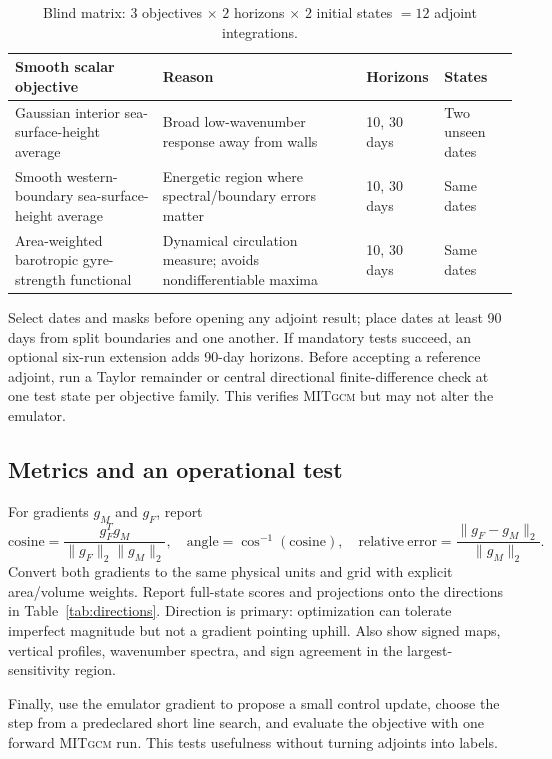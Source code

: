 \documentclass[11pt]{article}
\newcommand{\MITgcm}{\textsc{MITgcm}}
\begin{document}
\begin{table}[htbp]\centering\small
\caption{Blind matrix: \(3\) objectives \(\times\) \(2\) horizons \(\times\)
\(2\) initial states \(=12\) adjoint integrations.}
\label{tab:adjoints}
\begin{tabularx}{\textwidth}{@{}p{}Yp{0.17\textwidth}p{0.16\textwidth}@{}}
\toprule
\textbf{Smooth scalar objective} & \textbf{Reason} & \textbf{Horizons} & \textbf{States} \\
\midrule
Gaussian interior sea-surface-height average & Broad low-wavenumber response away from walls & 10, 30 days & Two unseen dates \\
Smooth western-boundary sea-surface-height average & Energetic region where spectral/boundary errors matter & 10, 30 days & Same dates \\
Area-weighted barotropic gyre-strength functional & Dynamical circulation measure; avoids nondifferentiable maxima & 10, 30 days & Same dates \\
\bottomrule
\end{tabularx}
\end{table}

Select dates and masks before opening any adjoint result; place dates at least 90 days
from split boundaries and one another. If mandatory tests succeed, an optional six-run
extension adds 90-day horizons. Before accepting a reference adjoint, run a Taylor
remainder or central directional finite-difference check at one test state per objective
family. This verifies \MITgcm{} but may not alter the emulator.

\subsection{Metrics and an operational test}
For gradients \(g_M\) and \(g_F\), report
\[
\mathrm{cosine}=\frac{g_F^Tg_M}{\lVert g_F\rVert_2\lVert g_M\rVert_2},
\quad
\mathrm{angle}=\cos^{-1}(\mathrm{cosine}),
\quad
\mathrm{relative\ error}=\frac{\lVert g_F-g_M\rVert_2}{\lVert g_M\rVert_2}.
\]
Convert both gradients to the same physical units and grid with explicit area/volume
weights. Report full-state scores and projections onto the directions in
Table~\ref{tab:directions}. Direction is primary: optimization can tolerate imperfect
magnitude but not a gradient pointing uphill. Also show signed maps, vertical profiles,
wavenumber spectra, and sign agreement in the largest-sensitivity region.

Finally, use the emulator gradient to propose a small control update, choose the step from
a predeclared short line search, and evaluate the objective with one forward \MITgcm{}
run. This tests usefulness without turning adjoints into labels.
\end{document}
